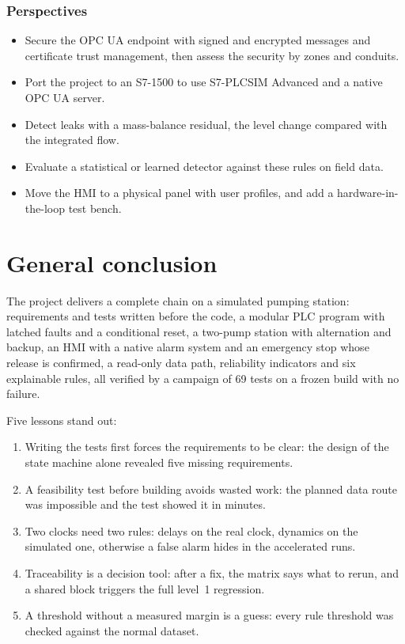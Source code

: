 \documentclass[11pt,a4paper]{report}
\begin{document}
	\subsection*{Perspectives}
	
	\begin{itemize}
		\item Secure the OPC UA endpoint with signed and encrypted messages and certificate trust management, then assess the security by zones and conduits.
		\item Port the project to an S7-1500 to use S7-PLCSIM Advanced and a native OPC UA server.
		\item Detect leaks with a mass-balance residual, the level change compared with the integrated flow.
		\item Evaluate a statistical or learned detector against these rules on field data.
		\item Move the HMI to a physical panel with user profiles, and add a hardware-in-the-loop test bench.
	\end{itemize}
	
	\chapter*{General conclusion}
	
	The project delivers a complete chain on a simulated pumping station: requirements and tests written before the code, a modular PLC program with latched faults and a conditional reset, a two-pump station with alternation and backup, an HMI with a native alarm system and an emergency stop whose release is confirmed, a read-only data path, reliability indicators and six explainable rules, all verified by a campaign of 69 tests on a frozen build with no failure.
	
	Five lessons stand out:
	\begin{enumerate}
		\item Writing the tests first forces the requirements to be clear: the design of the state machine alone revealed five missing requirements.
		\item A feasibility test before building avoids wasted work: the planned data route was impossible and the test showed it in minutes.
		\item Two clocks need two rules: delays on the real clock, dynamics on the simulated one, otherwise a false alarm hides in the accelerated runs.
		\item Traceability is a decision tool: after a fix, the matrix says what to rerun, and a shared block triggers the full level~1 regression.
		\item A threshold without a measured margin is a guess: every rule threshold was checked against the normal dataset.
	\end{enumerate}
	
\end{document}
